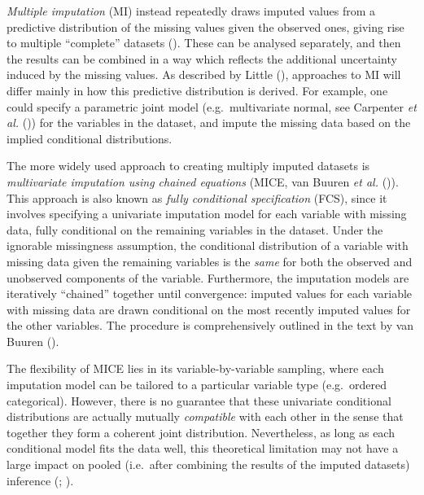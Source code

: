 \documentclass[
  letterpaper,
  DIV=11,
  numbers=noendperiod]{scrreprt}
\begin{document}
\emph{Multiple imputation} (MI) instead repeatedly draws imputed values
from a predictive distribution of the missing values given the observed
ones, giving rise to multiple ``complete'' datasets
(). These can be analysed
separately, and then the results can be combined in a way which reflects
the additional uncertainty induced by the missing values. As described
by Little (),
approaches to MI will differ mainly in how this predictive distribution
is derived. For example, one could specify a parametric joint model
(e.g.~multivariate normal, see Carpenter \emph{et al.}
()) for the variables in the
dataset, and impute the missing data based on the implied conditional
distributions.

The more widely used approach to creating multiply imputed datasets is
\emph{multivariate imputation using chained equations} (MICE, van Buuren
\emph{et al.}
()).
This approach is also known as \emph{fully conditional specification}
(FCS), since it involves specifying a univariate imputation model for
each variable with missing data, fully conditional on the remaining
variables in the dataset. Under the ignorable missingness assumption,
the conditional distribution of a variable with missing data given the
remaining variables is the \emph{same} for both the observed and
unobserved components of the variable. Furthermore, the imputation
models are iteratively ``chained'' together until convergence: imputed
values for each variable with missing data are drawn conditional on the
most recently imputed values for the other variables. The procedure is
comprehensively outlined in the text by van Buuren
().

The flexibility of MICE lies in its variable-by-variable sampling, where
each imputation model can be tailored to a particular variable type
(e.g.~ordered categorical). However, there is no guarantee that these
univariate conditional distributions are actually mutually
\emph{compatible} with each other in the sense that together they form a
coherent joint distribution. Nevertheless, as long as each conditional
model fits the data well, this theoretical limitation may not have a
large impact on pooled (i.e.~after combining the results of the imputed
datasets) inference
(; ).
\end{document}
